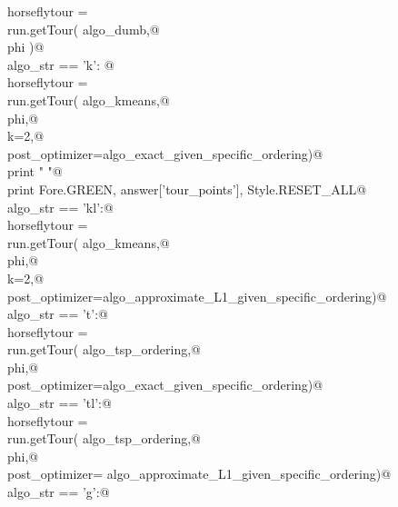\documentclass[11.5pt]{report}
\begin{document}
\begin{flushleft}
\begin{list}{}{}
\mbox{}\verb@      horseflytour = \@\\
\mbox{}\verb@             run.getTour( algo_dumb,@\\
\mbox{}\verb@                          phi )@\\
\mbox{}\verb@elif algo_str == 'k': @\\
\mbox{}\verb@      horseflytour = \@\\
\mbox{}\verb@             run.getTour( algo_kmeans,@\\
\mbox{}\verb@                          phi,@\\
\mbox{}\verb@                          k=2,@\\
\mbox{}\verb@                          post_optimizer=algo_exact_given_specific_ordering)@\\
\mbox{}\verb@      print " "@\\
\mbox{}\verb@      print Fore.GREEN, answer['tour_points'], Style.RESET_ALL@\\
\mbox{}\verb@elif algo_str == 'kl':@\\
\mbox{}\verb@      horseflytour = \@\\
\mbox{}\verb@             run.getTour( algo_kmeans,@\\
\mbox{}\verb@                          phi,@\\
\mbox{}\verb@                          k=2,@\\
\mbox{}\verb@                          post_optimizer=algo_approximate_L1_given_specific_ordering)@\\
\mbox{}\verb@elif algo_str == 't':@\\
\mbox{}\verb@      horseflytour = \@\\
\mbox{}\verb@             run.getTour( algo_tsp_ordering,@\\
\mbox{}\verb@                          phi,@\\
\mbox{}\verb@                          post_optimizer=algo_exact_given_specific_ordering)@\\
\mbox{}\verb@elif algo_str == 'tl':@\\
\mbox{}\verb@      horseflytour = \@\\
\mbox{}\verb@             run.getTour( algo_tsp_ordering,@\\
\mbox{}\verb@                          phi,@\\
\mbox{}\verb@                          post_optimizer= algo_approximate_L1_given_specific_ordering)@\\
\mbox{}\verb@elif algo_str == 'g':@\\

\end{list}
\end{flushleft}
\end{document}
